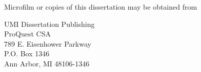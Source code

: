 \thispagestyle{plain}
\begin{center}
\vspace{2in}
{\large
Microfilm or copies of this dissertation may be obtained from}
\vspace{3in}

{\large
UMI Dissertation Publishing\\
ProQuest CSA\\
789 E. Eisenhower Parkway\\
P.O. Box 1346\\
Ann Arbor, MI 48106-1346}
\end{center}
